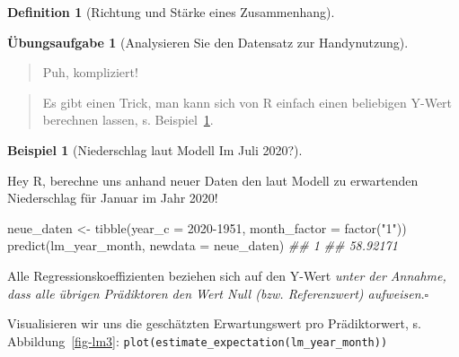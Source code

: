 \documentclass[
  a4paper,
  DIV=11]{scrreprt}
\newenvironment{Shaded}{\begin{snugshade}}{\end{snugshade}}
\newcommand{\AttributeTok}[1]{\textcolor[rgb]{0.40,0.45,0.13}{#1}}
\newcommand{\DecValTok}[1]{\textcolor[rgb]{0.68,0.00,0.00}{#1}}
\newcommand{\DocumentationTok}[1]{\textcolor[rgb]{0.37,0.37,0.37}{\textit{#1}}}
\newcommand{\FunctionTok}[1]{\textcolor[rgb]{0.28,0.35,0.67}{#1}}
\newcommand{\NormalTok}[1]{\textcolor[rgb]{0.00,0.23,0.31}{#1}}
\newcommand{\OtherTok}[1]{\textcolor[rgb]{0.00,0.23,0.31}{#1}}
\newcommand{\StringTok}[1]{\textcolor[rgb]{0.13,0.47,0.30}{#1}}
\theoremstyle{definition}
\newtheorem{exercise}{Übungsaufgabe}[chapter]
\theoremstyle{definition}
\newtheorem{example}{Beispiel}[chapter]
\theoremstyle{definition}
\newtheorem{definition}{Definition}[chapter]
\theoremstyle{remark}
\begin{document}
\begin{definition}[Richtung und Stärke eines
Zusammenhang]
\begin{exercise}[Analysieren Sie den Datensatz zur
Handynutzung]
\begin{quote}
{} Puh, kompliziert!
\end{quote}

\begin{quote}
{} Es gibt einen Trick, man kann sich von R einfach einen
beliebigen Y-Wert berechnen lassen, s. Beispiel~\ref{exm-niederschlag1}.
\end{quote}

\begin{example}[Niederschlag laut Modell Im Juli
2020?]\protect\hypertarget{exm-niederschlag1}{}\label{exm-niederschlag1}

Hey R, berechne uns anhand neuer Daten den laut Modell zu erwartenden
Niederschlag für Januar im Jahr 2020!

\begin{Shaded}
\begin{Highlighting}[]
\NormalTok{neue\_daten }\OtherTok{\textless{}{-}} \FunctionTok{tibble}\NormalTok{(}\AttributeTok{year\_c =} \DecValTok{2020{-}1951}\NormalTok{,}
                     \AttributeTok{month\_factor =} \FunctionTok{factor}\NormalTok{(}\StringTok{"1"}\NormalTok{))}
\FunctionTok{predict}\NormalTok{(lm\_year\_month, }\AttributeTok{newdata =}\NormalTok{ neue\_daten)}
\DocumentationTok{\#\#        1 }
\DocumentationTok{\#\# 58.92171}
\end{Highlighting}
\end{Shaded}

\end{example}

\begin{tcolorbox}[enhanced jigsaw, leftrule=.75mm, opacitybacktitle=0.6, colback=white, colframe=quarto-callout-note-color-frame, coltitle=black, colbacktitle=quarto-callout-note-color!10!white, opacityback=0, left=2mm, breakable, titlerule=0mm, toptitle=1mm, bottomtitle=1mm, rightrule=.15mm, title=\textcolor{quarto-callout-note-color}{\faInfo}\hspace{0.5em}{Hinweis}, arc=.35mm, bottomrule=.15mm, toprule=.15mm]

Alle Regressionskoeffizienten beziehen sich auf den Y-Wert \emph{unter
der Annahme, dass alle übrigen Prädiktoren den Wert Null (bzw.
Referenzwert) aufweisen}.\(\square\)

\end{tcolorbox}

Visualisieren wir uns die geschätzten Erwartungswert pro Prädiktorwert,
s. Abbildung~\ref{fig-lm3}:
\texttt{plot(estimate\_expectation(lm\_year\_month))}


\end{exercise}
\end{definition}
\end{document}
